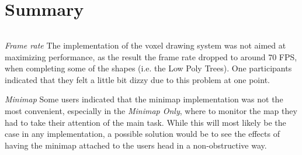 
\chapter{Summary}



\subparagraph[Future work]{}
\textit{Frame rate} The implementation of the voxel drawing system was not aimed at maximizing performance, as the result the frame rate dropped to around 70 FPS, when completing some of the shapes (i.e. the Low Poly Trees). One participants indicated that they felt a little bit dizzy due to this problem at one point.

\textit{Minimap} Some users indicated that the minimap implementation was not the most convenient, especially in the \textit{Minimap Only}, where to monitor the map they had to take their attention of the main task. While this will most likely be the case in any implementation, a possible solution would be to see the effects of having the minimap attached to the users head in a non-obstructive way.

